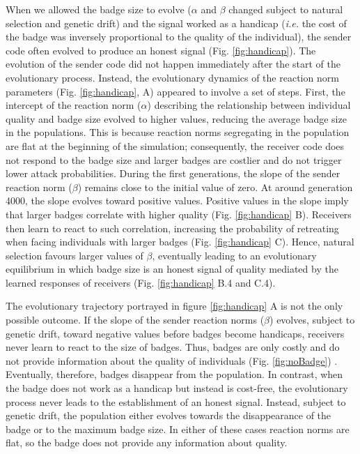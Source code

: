 \documentclass[
  12pt,
]{article}
\begin{document}
When we allowed the badge size to evolve (\(\alpha\) and \(\beta\)
changed subject to natural selection and genetic drift) and the signal
worked as a handicap (\emph{i.e.} the cost of the badge was inversely
proportional to the quality of the individual), the sender code often
evolved to produce an honest signal (Fig. \ref{fig:handicap}). The
evolution of the sender code did not happen immediately after the start
of the evolutionary process. Instead, the evolutionary dynamics of the
reaction norm parameters (Fig. \ref{fig:handicap}, A) appeared to
involve a set of steps. First, the intercept of the reaction norm
(\(\alpha\)) describing the relationship between individual quality and
badge size evolved to higher values, reducing the average badge size in
the populations. This is because reaction norms segregating in the
population are flat at the beginning of the simulation; consequently,
the receiver code does not respond to the badge size and larger badges
are costlier and do not trigger lower attack probabilities. During the
first generations, the slope of the sender reaction norm (\(\beta\))
remains close to the initial value of zero. At around generation 4000,
the slope evolves toward positive values. Positive values in the slope
imply that larger badges correlate with higher quality (Fig.
\ref{fig:handicap} B). Receivers then learn to react to such
correlation, increasing the probability of retreating when facing
individuals with larger badges (Fig. \ref{fig:handicap} C). Hence,
natural selection favours larger values of \(\beta\), eventually leading
to an evolutionary equilibrium in which badge size is an honest signal
of quality mediated by the learned responses of receivers (Fig.
\ref{fig:handicap} B.4 and C.4).

The evolutionary trajectory portrayed in figure \ref{fig:handicap} A is
not the only possible outcome. If the slope of the sender reaction norms
(\(\beta\)) evolves, subject to genetic drift, toward negative values
before badges become handicaps, receivers never learn to react to the
size of badges. Thus, badges are only costly and do not provide
information about the quality of individuals (Fig. \ref{fig:noBadge}) .
Eventually, therefore, badges disappear from the population. In
contrast, when the badge does not work as a handicap but instead is
cost-free, the evolutionary process never leads to the establishment of
an honest signal. Instead, subject to genetic drift, the population
either evolves towards the disappearance of the badge or to the maximum
badge size. In either of these cases reaction norms are flat, so the
badge does not provide any information about quality.
\end{document}
